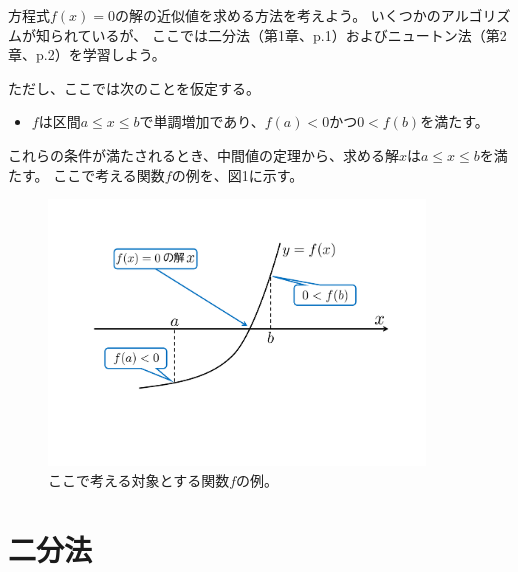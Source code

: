 \documentclass[a4paper, platex, dvipdfmx]{jsarticle}
\begin{document}
方程式$f(x)=0$の解の近似値を求める方法を考えよう。
いくつかのアルゴリズムが知られているが、
ここでは二分法（第1章、p.1）およびニュートン法（第2章、p.2）を学習しよう。

ただし、ここでは次のことを仮定する。
\begin{itemize}
  \item $f$は区間$a\leq x\leq b$で単調増加であり、$f(a)<0$かつ$0<f(b)$を満たす。
\end{itemize}
これらの条件が満たされるとき、中間値の定理から、求める解$x$は$a\leq x\leq b$を満たす。
ここで考える関数$f$の例を、図1に示す。
\begin{figure}
  \centering
  \includegraphics[width=10cm]{fig/figure1.pdf}
  \caption{ここで考える対象とする関数$f$の例。}
\end{figure}

\section{二分法}
\end{document}
